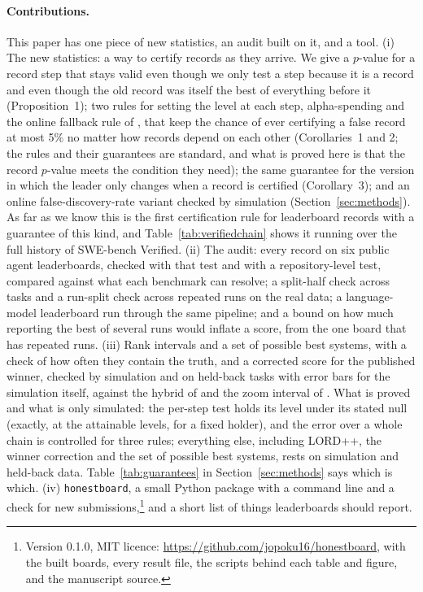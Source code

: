 \documentclass[11pt]{article}
\begin{document}
\paragraph{Contributions.}
This paper has one piece of new statistics, an audit built on it, and a tool.
(i) The new statistics: a way to certify records as they arrive. We give a $p$-value for a record step that stays valid even though we only test a step because it is a record and even though the old record was itself the best of everything before it (Proposition~1); two rules for setting the level at each step, alpha-spending and the online fallback rule of \citet{tian2021onlinefwer}, that keep the chance of ever certifying a false record at most 5\% no matter how records depend on each other (Corollaries~1 and 2; the rules and their guarantees are standard, and what is proved here is that the record $p$-value meets the condition they need); the same guarantee for the version in which the leader only changes when a record is certified (Corollary~3); and an online false-discovery-rate variant checked by simulation (Section~\ref{sec:methods}). As far as we know this is the first certification rule for leaderboard records with a guarantee of this kind, and Table~\ref{tab:verifiedchain} shows it running over the full history of SWE-bench Verified.
(ii) The audit: every record on six public agent leaderboards, checked with that test and with a repository-level test, compared against what each benchmark can resolve; a split-half check across tasks and a run-split check across repeated runs on the real data; a language-model leaderboard run through the same pipeline; and a bound on how much reporting the best of several runs would inflate a score, from the one board that has repeated runs.
(iii) Rank intervals and a set of possible best systems, with a check of how often they contain the truth, and a corrected score for the published winner, checked by simulation and on held-back tasks with error bars for the simulation itself, against the hybrid of \citet{andrews2024winners} and the zoom interval of \citet{zrnic2025flexible}.
What is proved and what is only simulated: the per-step test holds its level under its stated null (exactly, at the attainable levels, for a fixed holder), and the error over a whole chain is controlled for three rules; everything else, including LORD++, the winner correction and the set of possible best systems, rests on simulation and held-back data. Table~\ref{tab:guarantees} in Section~\ref{sec:methods} says which is which.
(iv) \texttt{honestboard}, a small Python package with a command line and a check for new submissions,\footnote{Version 0.1.0, MIT licence: \url{https://github.com/jopoku16/honestboard}, with the built boards, every result file, the scripts behind each table and figure, and the manuscript source.} and a short list of things leaderboards should report.
\end{document}
